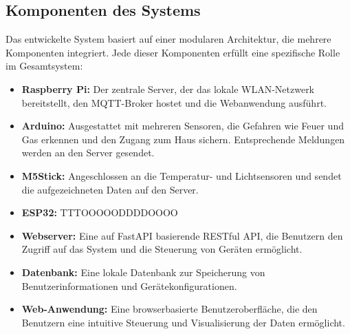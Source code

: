 \documentclass[12pt, letterpaper]{article}
\begin{document}
\subsection{Komponenten des Systems}
\par Das entwickelte System basiert auf einer modularen Architektur, die mehrere Komponenten integriert. Jede dieser Komponenten erfüllt eine spezifische Rolle im Gesamtsystem: 
\begin{itemize} 
  \item \textbf{Raspberry Pi:} Der zentrale Server, der das lokale WLAN-Netzwerk bereitstellt, den MQTT-Broker hostet und die Webanwendung ausführt. 
  \item \textbf{Arduino:} Ausgestattet mit mehreren Sensoren, die Gefahren wie Feuer und Gas erkennen und den Zugang zum Haus sichern. Entsprechende Meldungen werden an den Server gesendet.
  \item \textbf{M5Stick:} Angeschlossen an die Temperatur- und Lichtsensoren und sendet die aufgezeichneten Daten auf den Server. 
  \item \textbf{ESP32:} TTTOOOOODDDDOOOO 
  \item \textbf{Webserver:} Eine auf FastAPI basierende RESTful API, die Benutzern den Zugriff auf das System und die Steuerung von Geräten ermöglicht. 
  \item \textbf{Datenbank:} Eine lokale Datenbank zur Speicherung von Benutzerinformationen und Gerätekonfigurationen.
  \item \textbf{Web-Anwendung:} Eine browserbasierte Benutzeroberfläche, die den Benutzern eine intuitive Steuerung und Visualisierung der Daten ermöglicht. 
\end{itemize}
\end{document}

